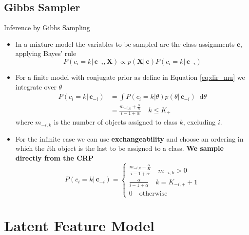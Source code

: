 \documentclass[aspectratio=169,xcolor=dvipsnames]{beamer}
\newcommand*\diff{\mathop{}\!\mathrm{d}}
\newcommand{\vecc}{\textbf{c}}
\newcommand{\matx}{\textbf{X}}
\newcommand{\aOverK}{\frac{\alpha}{K}}
\begin{document}
\subsection{Gibbs Sampler}
\begin{frame}{Inference by Gibbs Sampling}
\setlength{\leftmargini}{0.2cm}
\begin{itemize}[<+->]
\item In a mixture model the variables to be sampled are the class assignments $\vecc$, applying Bayes’ rule
\begin{equation*}
    P(c_i=k |\,\vecc_{-i}, \matx ) \propto p(\matx|\, \vecc) P(c_i=k|\,\vecc_{-i})
\end{equation*}
\item For a finite model with conjugate prior as define in Equation \ref{eq:dir_mu} we integrate over $\theta$
\begin{align*}
    P(c_i=k |\,\vecc_{-i}) &= \int P(c_i=k|\theta) p(\theta |\,\vecc_{-i}) \diff \theta \\
    &= \frac{m_{-i,k}+\aOverK}{i-1+\alpha} \quad k\leq K_+
\end{align*}
where $m_{-i,k}$ is the number of objects assigned to class $k$, excluding $i$.
\item For the infinite case we can use \textbf{exchangeability} and choose an ordering in which the $i$th object is the last to be assigned to a class. \textbf{We sample directly from the CRP}
\begin{equation*}
    P(c_i = k|\, \vecc_{-i})  =\begin{cases}
        \frac{m_{-i,k}+\aOverK}{i-1+\alpha} \quad m_{-i,k}>0\\
        \frac{\alpha}{i-1+\alpha} \quad k = K_{-i,+} + 1 \\
        0 \quad \text{otherwise}
    \end{cases}
\end{equation*}
\end{itemize}
\end{frame}

\section{Latent Feature Model}
\end{document}
